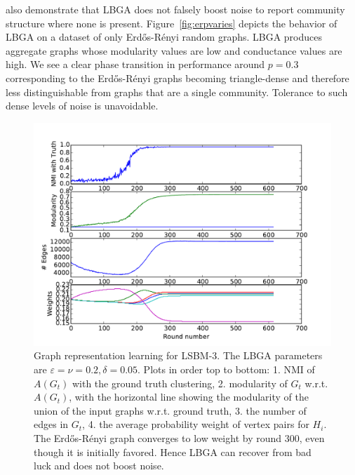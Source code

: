 \documentclass{article}
\newcommand{\er}{Erd\H{o}s-R\'{e}nyi }
\begin{document}
 also demonstrate that LBGA does not falsely
boost noise to report community structure where none is present.
Figure~\ref{fig:erpvaries} depicts the behavior of LBGA on a dataset of only
\er random graphs. LBGA produces aggregate graphs whose modularity values are
low and conductance values are high. We see a clear phase transition in
performance around $p = 0.3$ corresponding to the \er graphs becoming
triangle-dense and therefore less distinguishable from graphs that are a single
community. Tolerance to such dense levels of noise is unavoidable. 

\begin{figure}[t]
\begin{centering}
\includegraphics[width=\columnwidth]{figures/LBM-SNR=6+ER-consistentNO+NEF.pdf}
\par\end{centering}
\caption{Graph representation learning for LSBM-3. The LBGA parameters are
$\varepsilon=\nu=0.2, \delta=0.05$. Plots in order top to bottom: 1. NMI of
$A(G_t)$ with the ground truth clustering, 2. modularity of $G_t$ w.r.t.
$A(G_t)$, with the horizontal line showing the modularity of the union of the
input graphs w.r.t. ground truth, 3. the number of edges in $G_t$, 4.  the
average probability weight of vertex pairs for $H_i$.  The \er graph converges
to low weight by round 300, even though it is initially favored. Hence
LBGA can recover from bad luck and does not boost noise.} 
\label{fig:local-sbm} 
\end{figure}
\end{document}
